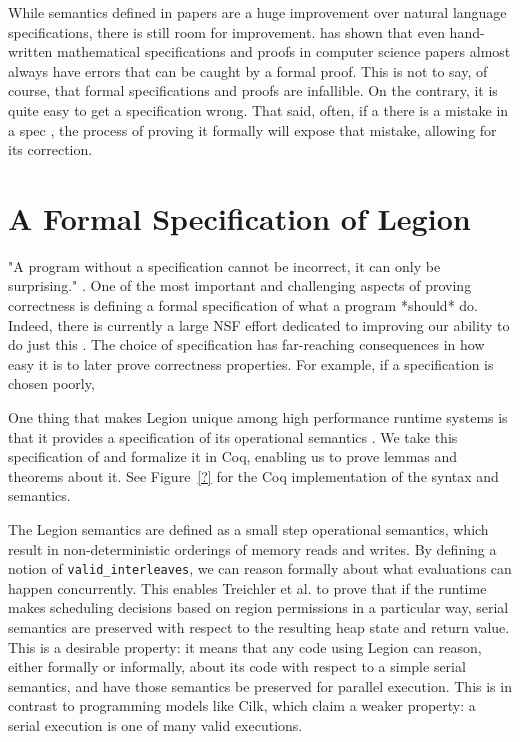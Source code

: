 \documentclass[sigplan]{acmart}
\begin{document}
While semantics defined in papers are a huge improvement over natural language
specifications, there is still room for improvement. \cite{formalspec vs paper} has 
shown that even hand-written mathematical specifications and proofs in computer
science papers almost always have errors that can be caught by a formal proof.
This is not to say, of course, that formal specifications and proofs are
infallible.  On the contrary, it is quite easy to get a specification wrong.
That said, often, if a there is a mistake in a spec , the process of proving it
formally will expose that mistake, allowing for its correction. 

\section{A Formal Specification of Legion}

"A program without a specification cannot be incorrect, it can only be
surprising." \cite{appel}. One of the most important and challenging aspects of
proving correctness is defining a formal specification of what a program
*should* do. Indeed, there is currently a large NSF effort dedicated to
improving our ability to do just this \cite{deepspec}. The choice of
specification has far-reaching consequences in how easy it is to later prove
correctness properties. For example, if a specification is chosen poorly, 

One thing that makes Legion unique among high performance runtime systems is
that it provides a specification of its operational semantics \cite{oopsla13}.
We take this specification of and formalize it in Coq, enabling us to prove
lemmas and theorems about it. See Figure~\ref{?} for the Coq implementation of the
syntax and semantics.

The Legion semantics are defined as a small step operational semantics, which
result in non-deterministic orderings of memory reads and writes. By defining a
notion of \texttt{valid\_interleaves}, we can reason formally about what evaluations 
can happen concurrently. This enables Treichler et al. to prove that if the runtime
makes scheduling decisions based on region permissions in a particular way, serial 
semantics are preserved with respect to the resulting heap state and return
value. This is a desirable property: it means that any code using Legion can
reason, either formally or informally, about its code with respect to a simple
serial semantics, and have those semantics be preserved for parallel execution.
This is in contrast to programming models like Cilk, which claim a weaker
property: a serial execution is one of many valid executions. 
\end{document}
